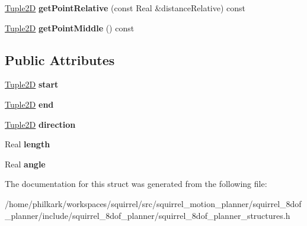 \begin{DoxyCompactItemize}
\item 
\hypertarget{structSquirrelMotionPlanner_1_1LineSegment2D_ade468259f41f30a3790a4866b5f4a9a9}{\hyperlink{structSquirrelMotionPlanner_1_1Tuple2D}{Tuple2\-D} {\bfseries get\-Point\-Relative} (const Real \&distance\-Relative) const }\label{structSquirrelMotionPlanner_1_1LineSegment2D_ade468259f41f30a3790a4866b5f4a9a9}

\item 
\hypertarget{structSquirrelMotionPlanner_1_1LineSegment2D_ac193f0033b79ec2c4e6f4713bdac0a88}{\hyperlink{structSquirrelMotionPlanner_1_1Tuple2D}{Tuple2\-D} {\bfseries get\-Point\-Middle} () const }\label{structSquirrelMotionPlanner_1_1LineSegment2D_ac193f0033b79ec2c4e6f4713bdac0a88}

\end{DoxyCompactItemize}
\subsection*{Public Attributes}
\begin{DoxyCompactItemize}
\item 
\hypertarget{structSquirrelMotionPlanner_1_1LineSegment2D_ac035e60dbc3b11b2b0eecfefdb3d5d84}{\hyperlink{structSquirrelMotionPlanner_1_1Tuple2D}{Tuple2\-D} {\bfseries start}}\label{structSquirrelMotionPlanner_1_1LineSegment2D_ac035e60dbc3b11b2b0eecfefdb3d5d84}

\item 
\hypertarget{structSquirrelMotionPlanner_1_1LineSegment2D_a56c9dcc63f59a98802c2f2a80535352e}{\hyperlink{structSquirrelMotionPlanner_1_1Tuple2D}{Tuple2\-D} {\bfseries end}}\label{structSquirrelMotionPlanner_1_1LineSegment2D_a56c9dcc63f59a98802c2f2a80535352e}

\item 
\hypertarget{structSquirrelMotionPlanner_1_1LineSegment2D_a073679c13a5ea19dddd1f040e555157c}{\hyperlink{structSquirrelMotionPlanner_1_1Tuple2D}{Tuple2\-D} {\bfseries direction}}\label{structSquirrelMotionPlanner_1_1LineSegment2D_a073679c13a5ea19dddd1f040e555157c}

\item 
\hypertarget{structSquirrelMotionPlanner_1_1LineSegment2D_a68aaf10859c73ba95ecc015de87520f3}{Real {\bfseries length}}\label{structSquirrelMotionPlanner_1_1LineSegment2D_a68aaf10859c73ba95ecc015de87520f3}

\item 
\hypertarget{structSquirrelMotionPlanner_1_1LineSegment2D_abc98f63021230fb9d77fd2863f8b50d3}{Real {\bfseries angle}}\label{structSquirrelMotionPlanner_1_1LineSegment2D_abc98f63021230fb9d77fd2863f8b50d3}

\end{DoxyCompactItemize}


The documentation for this struct was generated from the following file\-:\begin{DoxyCompactItemize}
\item 
/home/philkark/workspaces/squirrel/src/squirrel\-\_\-motion\-\_\-planner/squirrel\-\_\-8dof\-\_\-planner/include/squirrel\-\_\-8dof\-\_\-planner/squirrel\-\_\-8dof\-\_\-planner\-\_\-structures.\-h\end{DoxyCompactItemize}
